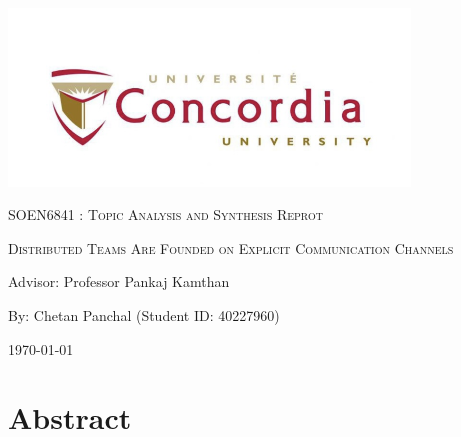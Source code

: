 \documentclass[12pt]{article}
\begin{document}
\begin{titlepage}
    \centering
    \includegraphics[width=0.8\textwidth]{image.jpeg}\par %
     \vspace{2cm}
    {\scshape\Large SOEN6841 : Topic Analysis and Synthesis Reprot \par}
    \vspace{1.5cm}
    {\scshape\Huge Distributed Teams Are Founded on Explicit
Communication Channels\par}
    \vspace{1.5cm}
    \vspace{1.5cm}
    {\large Advisor: Professor Pankaj Kamthan\par}
    \vspace{1.5cm}
    {\large By: Chetan Panchal (Student ID: 40227960)\par}
    \vspace{1cm}
    {\large \today\par}
\end{titlepage}

\tableofcontents
\newpage

\section*{Abstract}
\end{document}
